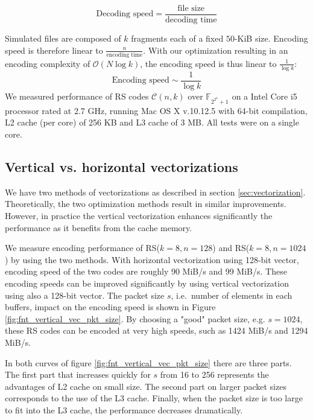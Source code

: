 \documentclass[oneside,9pt]{article}
\newcommand{\bigo}[1]{ \mathcal{O}(#1) }
\newcommand{\ec}[2]{ \mathcal{C}(#1, #2) }
\newcommand{\gf}[2][]{ \mathbb{F}_{{#2}^{#1}} }
\newcommand{\fftl}{N}
\begin{document}
\begin{equation}\label{eq:dec_metric_def}
\text{Decoding speed} =  \frac{ \text{file size}  }{ \text{decoding time} }
\end{equation}

Simulated files are composed of $k$ fragments each of a fixed  $50$-KiB size. Encoding speed is therefore linear to $\frac{n}{\text{encoding time}}$. With our optimization resulting in an encoding complexity of $\bigo{\fftl \log{k}}$, the encoding speed is thus linear to $\frac{1}{\log{k}}$:
\begin{equation}\label{eq:enc_metric_on_k}
\text{Encoding speed} \sim  \frac{ 1 }{ \log{k} }
\end{equation}
We measured performance of RS codes $\ec{n}{k}$ over $\gf{2^{2^4}+1}$ on a Intel Core i5 processor rated at 2.7 GHz, running Mac OS X v.10.12.5 with 64-bit compilation, L2 cache (per core) of 256 KB and L3 cache of 3 MB. All tests were on a single core.
% 
% 

\subsection{Vertical vs. horizontal vectorizations}

We have two methods of vectorizations as described in section \ref{sec:vectorization}. Theoretically, the two optimization methods result in similar improvements. However, in practice  the vertical vectorization enhances significantly the performance as it benefits from the cache memory.

We measure encoding performance of RS($k=8, n=128$) and RS($k=8, n=1024$) by using the two methods. With horizontal vectorization using 128-bit vector, encoding speed of the two codes are  roughly 90 MiB/s and 99 MiB/s. These encoding speeds can be improved significantly by using vertical vectorization using also a 128-bit vector. The packet size $s$, i.e.\ number of elements in each buffers, impact on the encoding speed is shown in Figure \ref{fig:fnt_vertical_vec_pkt_size}. By choosing a "good" packet size, e.g. $s=1024$, these RS codes can be encoded at very high speeds, such as 1424 MiB/s and 1294 MiB/s.

In both curves of figure \ref{fig:fnt_vertical_vec_pkt_size} there are three parts. The first part that increases quickly for $s$ from 16 to 256 represents the advantages of L2 cache on small size. The second part on larger packet sizes corresponds to the use of the L3 cache. Finally, when the packet size is too large to fit into the L3 cache, the performance decreases dramatically.
\end{document}
